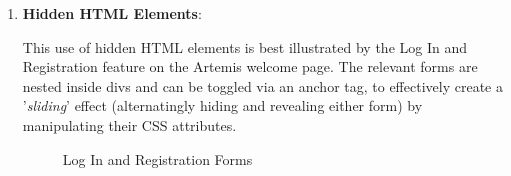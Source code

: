 \newpage
\begin{enumerate}

\item\textbf{Hidden HTML Elements}:

This use of hidden HTML elements is best illustrated by the  Log In and Registration feature on the Artemis welcome page. The relevant forms are nested inside divs and can be toggled via an anchor tag, to effectively create a '\textit{sliding}' effect (alternatingly hiding and revealing either form) by manipulating their CSS attributes. 

\begin{figure}[H]
    \begin{center}
        \caption[Log In and Registration Forms]{Log In and Registration Forms}
    \end{center}
\end{figure}


\end{enumerate}
